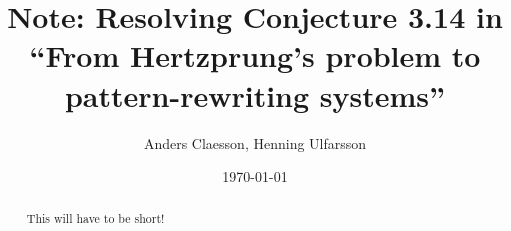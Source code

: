 \documentclass[a4paper]{article}
\title{Note: Resolving Conjecture 3.14 in ``From Hertzprung's problem to pattern-rewriting systems''}
\author{Anders Claesson, Henning Ulfarsson}
\date{\today}
\begin{document}
\maketitle

\begin{abstract}
    This will have to be short!
\end{abstract}
\end{document}
